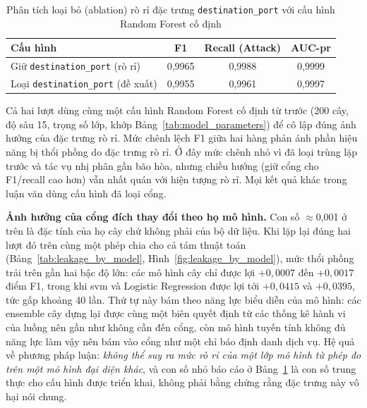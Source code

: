 \begin{table}[htbp]
\centering
\caption[Phân tích loại bỏ (ablation) rò rỉ đặc trưng cổng đích]{Phân tích loại bỏ (ablation) rò rỉ đặc trưng \texttt{destination\_port} với cấu hình Random Forest cố định}
\label{tab:leakage_ablation}
\begin{tabular*}{\textwidth}{@{\extracolsep{\fill}}lccc@{}}
\toprule
\textbf{Cấu hình} & \textbf{F1} & \textbf{Recall (Attack)} & \textbf{AUC-\ac{pr}} \\ \midrule
Giữ \texttt{destination\_port} (rò rỉ) & 0{,}9965 & 0{,}9988 & 0{,}9999 \\
Loại \texttt{destination\_port} (đề xuất) & 0{,}9955 & 0{,}9961 & 0{,}9997 \\ \bottomrule
\end{tabular*}
\end{table}

Cả hai lượt dùng cùng một cấu hình Random Forest cố định từ trước (200 cây, độ sâu 15, trọng số lớp, khớp Bảng~\ref{tab:model_parameters}) để cô lập đúng ảnh hưởng của đặc trưng rò rỉ. Mức chênh lệch F1 giữa hai hàng phản ánh phần hiệu năng bị thổi phồng do đặc trưng rò rỉ. Ở đây mức chênh nhỏ vì đã loại trùng lặp trước và tác vụ nhị phân gần bão hòa, nhưng chiều hướng (giữ cổng cho F1/recall cao hơn) vẫn nhất quán với hiện tượng rò rỉ. Mọi kết quả khác trong luận văn dùng cấu hình đã loại cổng.

\textbf{Ảnh hưởng của cổng đích thay đổi theo họ mô hình.} Con số $\approx$0{,}001 ở trên là đặc tính của họ cây chứ không phải của bộ dữ liệu. Khi lặp lại đúng hai lượt đó trên cùng một phép chia cho cả tám thuật toán (Bảng~\ref{tab:leakage_by_model}, Hình~\ref{fig:leakage_by_model}), mức thổi phồng trải trên gần hai bậc độ lớn: các mô hình cây chỉ được lợi $+0{,}0007$ đến $+0{,}0017$ điểm F1, trong khi \ac{svm} và Logistic Regression được lợi tới $+0{,}0415$ và $+0{,}0395$, tức gấp khoảng 40 lần. Thứ tự này bám theo năng lực biểu diễn của mô hình: các ensemble cây dựng lại được cùng một biên quyết định từ các thống kê hành vi của luồng nên gần như không cần đến cổng, còn mô hình tuyến tính không đủ năng lực làm vậy nên bám vào cổng như một chỉ báo định danh dịch vụ. Hệ quả về phương pháp luận: \emph{không thể suy ra mức rò rỉ của một lớp mô hình từ phép đo trên một mô hình đại diện khác}, và con số nhỏ báo cáo ở Bảng~\ref{tab:leakage_ablation} là con số trung thực cho cấu hình được triển khai, không phải bằng chứng rằng đặc trưng này vô hại nói chung.

